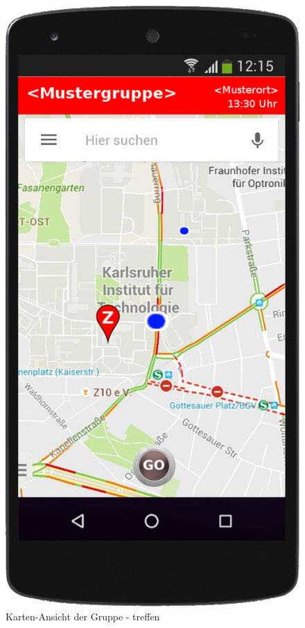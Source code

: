 \begin{figure}
	\includegraphics[scale=0.2]{resources/images/handy/map_go.png}
	\caption{Karten-Ansicht der Gruppe - treffen}
\end{figure}

